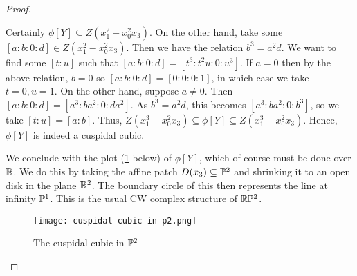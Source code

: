 \begin{proof}
\begin{enumerate}[label = (\alph*)]
        Certainly $\phi[Y] \subseteq Z(x_1^2 - x_0^2 x_3)$. On the other hand, take some $[a : b : 0 : d] \in Z(x_1^2 - x_0^2 x_3)$. Then we have the relation $b^3 = a^2 d$. We want to find some $[t : u]$ such that $[a : b : 0 : d] = [t^3 : t^2 u : 0 : u^3]$. If $a = 0$ then by the above relation, $b = 0$ so $[a : b : 0 : d] = [0 : 0 : 0 : 1]$, in which case we take $t = 0, u = 1$. On the other hand, suppose $a \neq 0$. Then $[a : b : 0 : d] = [a^3 : b a^2 : 0 : d a^2]$. As $b^3 = a^2 d$, this becomes $[a^3 : b a^2 : 0 : b^3]$, so we take $[t : u] = [a : b]$. Thus, $Z(x_1^3 - x_0^2 x_3) \subseteq \phi[Y] \subseteq Z(x_1^3 - x_0^2 x_3)$. Hence, $\phi[Y]$ is indeed a cuspidal cubic.

        We conclude with the plot (\ref{fig1.3.3} below) of $\phi[Y]$, which of course must be done over $\R$. We do this by taking the affine patch $D(x_3) \subseteq \P^2$ and shrinking it to an open disk in the plane $\R^2$. The boundary circle of this then represents the line at infinity $\P^1$. This is the usual CW complex structure of $\R\P^2$.

        \begin{figure}[h]
            \centering
            \texttt{[image: cuspidal-cubic-in-p2.png]}
            \caption{The cuspidal cubic in $\P^2$}
            \label{fig1.3.3}
        \end{figure}

    \end{enumerate}
\end{proof}
